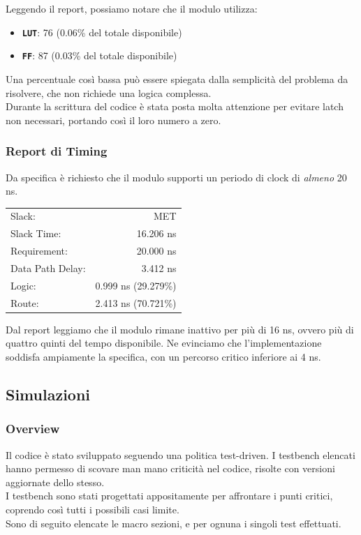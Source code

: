 \documentclass{article}
\begin{document}
Leggendo il report, possiamo notare che il modulo utilizza:
\begin{itemize}[label=\raisebox{0.25ex}{\tiny$\bullet$}]
    \item \texttt{\textbf{LUT}}: 76 (0.06\% del totale disponibile)
    \item \texttt{\textbf{FF}}: 87 (0.03\% del totale disponibile)
\end{itemize}

Una percentuale così bassa può essere spiegata dalla semplicità del problema da risolvere, che non richiede una logica complessa.
\smallskip \\ Durante la scrittura del codice è stata posta molta attenzione per evitare latch non necessari, portando così il loro numero a zero.

\subsubsection{Report di Timing}
Da specifica è richiesto che il modulo supporti un periodo di clock di \textit{almeno} 20 ns.

\begin{center}
    \begin{tabular}{l r}
        Slack: & MET \\
        Slack Time: & 16.206 ns \\
        Requirement: & 20.000 ns \\
        Data Path Delay: & 3.412 ns \\
        Logic: & 0.999 ns (29.279\%) \\
        Route: & 2.413 ns (70.721\%)
    \end{tabular}
\end{center}

Dal report leggiamo che il modulo rimane inattivo per più di 16 ns, ovvero più di quattro quinti del tempo disponibile.
Ne evinciamo che l'implementazione soddisfa ampiamente la specifica, con un percorso critico inferiore ai 4 ns. 

\bigskip
\subsection{Simulazioni}
\subsubsection{Overview}
Il codice è stato sviluppato seguendo una politica test-driven. I testbench elencati hanno permesso di scovare man mano criticità nel codice, risolte con versioni aggiornate dello stesso.
\smallskip \\ I testbench sono stati progettati appositamente per affrontare i punti critici, coprendo così tutti i possibili casi limite.
\smallskip \\ Sono di seguito elencate le macro sezioni, e per ognuna i singoli test effettuati.
\end{document}
